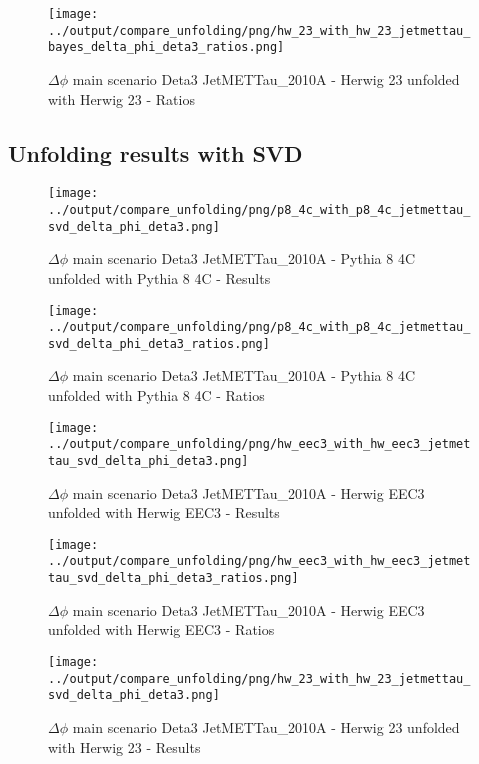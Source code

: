 \documentclass[11pt]{book}
\begin{document}
\begin{figure}[ht]
\centering
\texttt{[image: ../output/compare\_unfolding/png/hw\_23\_with\_hw\_23\_jetmettau\_bayes\_delta\_phi\_deta3\_ratios.png]}
\caption{$\Delta\phi$ main scenario Deta3 JetMETTau\_2010A - Herwig 23 unfolded with Herwig 23 - Ratios}
\label{hw_23_hw_23_jetmettau_bayes_delta_phi_deta3_b}
\end{figure}


\clearpage
\subsection{Unfolding results with SVD}
\begin{figure}[ht]
\centering
\texttt{[image: ../output/compare\_unfolding/png/p8\_4c\_with\_p8\_4c\_jetmettau\_svd\_delta\_phi\_deta3.png]}
\caption{$\Delta\phi$ main scenario Deta3 JetMETTau\_2010A - Pythia 8 4C unfolded with Pythia 8 4C - Results}
\label{p8_p8_jetmettau_svd_delta_phi_deta3_a}
\end{figure}

\begin{figure}[ht]
\centering
\texttt{[image: ../output/compare\_unfolding/png/p8\_4c\_with\_p8\_4c\_jetmettau\_svd\_delta\_phi\_deta3\_ratios.png]}
\caption{$\Delta\phi$ main scenario Deta3 JetMETTau\_2010A - Pythia 8 4C unfolded with Pythia 8 4C - Ratios}
\label{p8_p8_jetmettau_svd_delta_phi_deta3_b}
\end{figure}

\begin{figure}[ht]
\centering
\texttt{[image: ../output/compare\_unfolding/png/hw\_eec3\_with\_hw\_eec3\_jetmettau\_svd\_delta\_phi\_deta3.png]}
\caption{$\Delta\phi$ main scenario Deta3 JetMETTau\_2010A - Herwig EEC3 unfolded with Herwig EEC3 - Results}
\label{hw_eec3_hw_eec3_jetmettau_svd_delta_phi_deta3_a}
\end{figure}

\begin{figure}[ht]
\centering
\texttt{[image: ../output/compare\_unfolding/png/hw\_eec3\_with\_hw\_eec3\_jetmettau\_svd\_delta\_phi\_deta3\_ratios.png]}
\caption{$\Delta\phi$ main scenario Deta3 JetMETTau\_2010A - Herwig EEC3 unfolded with Herwig EEC3 - Ratios}
\label{hw_eec3_hw_eec3_jetmettau_svd_delta_phi_deta3_b}
\end{figure}

\begin{figure}[ht]
\centering
\texttt{[image: ../output/compare\_unfolding/png/hw\_23\_with\_hw\_23\_jetmettau\_svd\_delta\_phi\_deta3.png]}
\caption{$\Delta\phi$ main scenario Deta3 JetMETTau\_2010A - Herwig 23 unfolded with Herwig 23 - Results}
\label{hw_23_hw_23_jetmettau_svd_delta_phi_deta3_a}
\end{figure}
\end{document}
